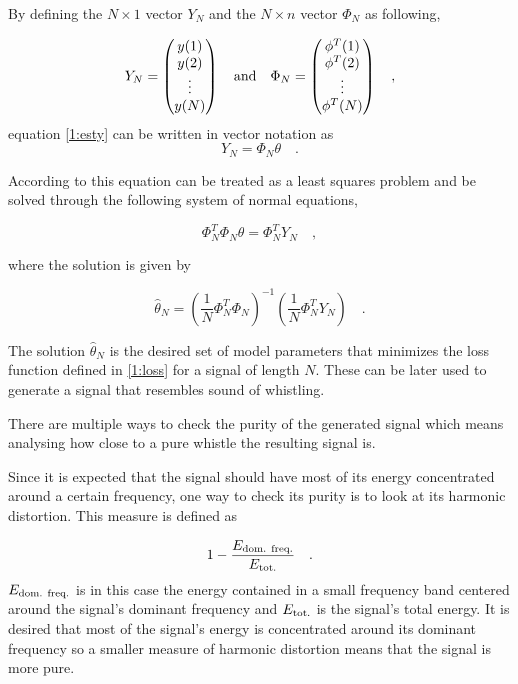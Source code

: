 \documentclass{IEEEtran}
\begin{document}
By defining the $N\times1$ vector $Y_N$ and the $N\times n$ vector
$\Phi_N$ as following,

\begin{equation}
  Y_N =
  \begin{pmatrix}
    y(1) \\ y(2) \\ \vdots \\ y(N)
  \end{pmatrix}
  \quad
  \textnormal{and}
  \quad
  \Phi_N =
  \begin{pmatrix}
    \phi^T(1) \\ \phi^T(2) \\ \vdots \\ \phi^T(N)
  \end{pmatrix}
  \quad ,
\end{equation}
equation \ref{1:esty} can be written in vector notation as
\begin{equation}
  Y_N = \Phi_N\theta \quad .
\end{equation}

According to \cite{signalproc} this equation can be treated as a least
squares problem and be solved through the following system of normal
equations,

\begin{equation}
  \Phi_N^T\Phi_N\theta = \Phi_N^T Y_N \quad ,
\end{equation}

where the solution is given by

\begin{equation}
  \hat{\theta}_N = \left( \frac{1}{N}\Phi_N^T\Phi_N \right)^{-1}
                   \left( \frac{1}{N}\Phi_N^T Y_N \right)
  \quad .
\end{equation}

The solution $\hat{\theta}_N$ is the desired set of model parameters
that minimizes the loss function defined in \ref{1:loss} for a signal
of length $N$. These can be later used to generate a signal that
resembles sound of whistling.

There are multiple ways to check the purity of the generated signal which
means analysing how close to a pure whistle the resulting signal is.

Since it is expected that the signal should have most of its energy
concentrated around a certain frequency, one way to check its purity
is to look at its harmonic distortion. This measure is defined as

\begin{equation}
  \label{1:hdist}
  1 - \frac{E_{\textnormal{dom. freq.}}}{E_{\textnormal{tot.}}}\quad .
\end{equation}
$E_{\textnormal{dom. freq.}}$ is in this case the energy contained in
a small frequency band centered around the signal's dominant frequency
and $E_{\textnormal{tot.}}$ is the signal's total energy. It is desired
that most of the signal's energy is concentrated around its dominant
frequency so a smaller measure of harmonic distortion means that the
signal is more pure.
\end{document}
